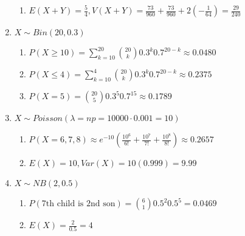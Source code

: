 \documentclass[12pt, a4paper]{article}
\begin{document}
\begin{enumerate}[Q\arabic*.]
\begin{enumerate}[(\roman*)]
      \item $E(X+Y) = \frac{5}{4}, V(X+Y) = \frac{73}{960} + \frac{73}{960} + 2(-\frac{1}{64}) = \frac{29}{240}$
    \end{enumerate}

  \item $X \sim Bin(20,0.3)$
    \begin{enumerate}[(\roman*)]
      \item $P(X\geq 10) = \sum^20_{k=10} \binom{20}k 0.3^k 0.7^{20-k} \approx 0.0480$
      \item $P(X\leq 4) = \sum^4_{k=10} \binom{20}k 0.3^k 0.7^{20-k} \approx 0.2375$
      \item $P(X=5) = \binom{20}5 0.3^5 0.7^{15} \approx 0.1789$
    \end{enumerate}

  \item $X \sim Poisson(\lambda = np = 10000\cdot 0.001 = 10)$
    \begin{enumerate}[(\roman*)]
      \item $P(X = 6,7, 8) \approx e^{-10}(\frac{10^6}{6!} + \frac{10^7}{7!} + \frac{10^8}{8!}) \approx 0.2657$

      \item $E(X) = 10, Var(X) = 10(0.999) = 9.99$ 
    \end{enumerate}

  \item $X \sim NB(2, 0.5)$
    \begin{enumerate}[(\roman*)]
      \item $P(\text{7th child is 2nd son}) = \binom 61 0.5^2 0.5^5 = 0.0469$

      \item $E(X) = \frac{2}{0.5} = 4$
    \end{enumerate}


\end{enumerate}
\end{document}
